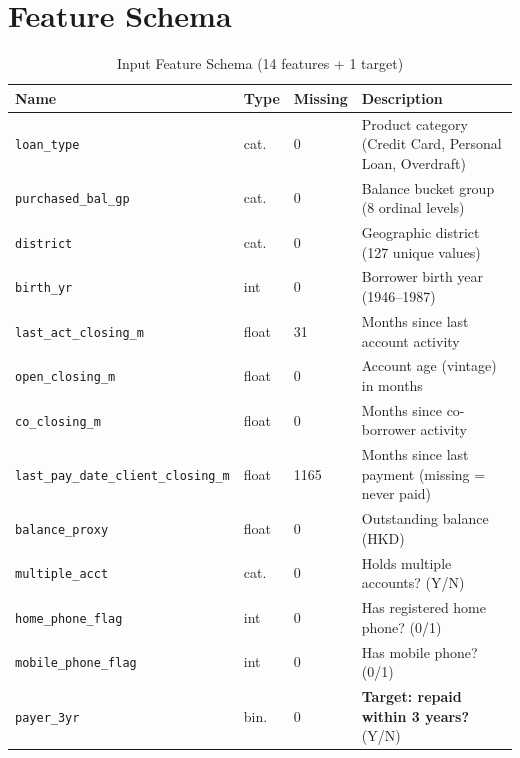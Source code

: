 \documentclass[11pt, a4paper]{article}
\begin{document}
\appendix
\renewcommand{\thetable}{A\arabic{table}}
\renewcommand{\thefigure}{A\arabic{figure}}
\setcounter{table}{0}
\setcounter{figure}{0}

\section{Feature Schema}\label{app:schema}

\begin{table}[H]
\centering
\caption{Input Feature Schema (14 features + 1 target)}
\label{tab:schema}
\small
\begin{tabular}{@{}lllp{5.5cm}@{}}
\toprule
\textbf{Name} & \textbf{Type} & \textbf{Missing} & \textbf{Description}\\
\midrule
\texttt{loan\_type}       & cat.   & 0     & Product category (Credit Card, Personal Loan, Overdraft)\\
\texttt{purchased\_bal\_gp}& cat.  & 0     & Balance bucket group (8 ordinal levels)\\
\texttt{district}         & cat.   & 0     & Geographic district (127 unique values)\\
\texttt{birth\_yr}        & int    & 0     & Borrower birth year (1946--1987)\\
\texttt{last\_act\_closing\_m} & float & 31  & Months since last account activity\\
\texttt{open\_closing\_m} & float & 0     & Account age (vintage) in months\\
\texttt{co\_closing\_m}   & float & 0     & Months since co-borrower activity\\
\texttt{last\_pay\_date\_client\_closing\_m} & float & 1165 & Months since last payment (missing = never paid)\\
\texttt{balance\_proxy}   & float & 0     & Outstanding balance (HKD)\\
\texttt{multiple\_acct}   & cat.   & 0     & Holds multiple accounts? (Y/N)\\
\texttt{home\_phone\_flag}& int    & 0     & Has registered home phone? (0/1)\\
\texttt{mobile\_phone\_flag}& int   & 0     & Has mobile phone? (0/1)\\
\midrule
\texttt{payer\_3yr}       & bin.   & 0     & \textbf{Target: repaid within 3 years?} (Y/N)\\
\bottomrule
\end{tabular}
\end{table}
\end{document}
